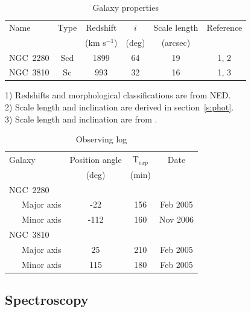 \documentclass[useAMS,usenatbib]{mn2e}
\begin{document}
\begin{table}
\begin{center}
    \caption{Galaxy properties}
    \begin{tabular}{@{}lccccc@{}}
    \hline
    Name  & Type & Redshift  & $i$  & Scale length &  Reference \\
          &      &  (km s$^{-1}$) &   (deg) &  (arcsec) &        \\
    \hline
    NGC~2280  & Scd & 1899   &     64      &   19     & 1, 2    \\
    NGC~3810  & Sc  &  993   &     32      &   16     & 1, 3    \\
    \hline
    \end{tabular}
    \label{t:properties}
\end{center}
\vspace{-0.25cm}
1) Redshifts and morphological classifications are from NED. \\
2) Scale length and inclination are derived in section~\ref{s:phot}. \\
3) Scale length and inclination are from \citet{knapen2003}. \\
\end{table}

\begin{table}
  \centering
    \caption{Observing log}
    \begin{tabular}{@{}lccc@{}}
    \hline
    Galaxy & Position angle & T$_{exp}$  & Date\\
           &   (deg)        & (min) & \\
    \hline
    NGC~2280 & & & \\
    \ \ \ Major axis &  -22 & 156 & Feb 2005 \\
    \ \ \ Minor axis & -112 & 160 & Nov 2006 \\
    NGC~3810 & & & \\
    \ \ \ Major axis &   25 & 210 & Feb 2005 \\
    \ \ \ Minor axis &  115 & 180 & Feb 2005 \\
    \hline
    \end{tabular}
    \label{t:obslog}
\end{table}


\subsection{Spectroscopy}
\end{document}
